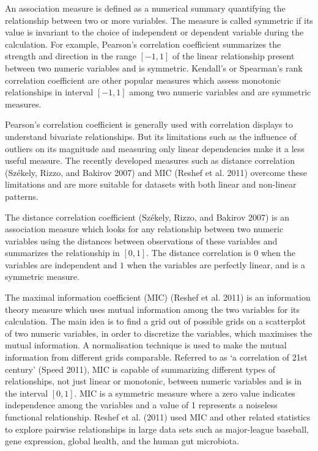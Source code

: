 An association measure is defined as a numerical summary quantifying the relationship between two or more variables. The measure is called symmetric if its value is invariant to the choice of independent or dependent variable during the calculation. For example, Pearson's correlation coefficient summarizes the strength and direction in the range \([-1,1]\) of the linear relationship present between two numeric variables and is symmetric. Kendall's or Spearman's rank correlation coefficient are other popular measures which assess monotonic relationships in interval \([-1,1]\) among two numeric variables and are symmetric measures.

Pearson's correlation coefficient is generally used with correlation displays to understand bivariate relationships. But its limitations such as the influence of outliers on its magnitude and measuring only linear dependencies make it a less useful measure. The recently developed measures such as distance correlation (Székely, Rizzo, and Bakirov 2007) and MIC (Reshef et al. 2011) overcome these limitations and are more suitable for datasets with both linear and non-linear patterns.

The distance correlation coefficient (Székely, Rizzo, and Bakirov 2007) is an association measure which looks for any relationship between two numeric variables using the distances between observations of these variables and summarizes the relationship in \([0,1]\). The distance correlation is \(0\) when the variables are independent and \(1\) when the variables are perfectly linear, and is a symmetric measure.

The maximal information coefficient (MIC) (Reshef et al. 2011) is an information theory measure which uses mutual information among the two variables for its calculation. The main idea is to find a grid out of possible grids on a scatterplot of two numeric variables, in order to discretize the variables, which maximises the mutual information. A normalisation technique is used to make the mutual information from different grids comparable. Referred to as `a correlation of 21st century' (Speed 2011), MIC is capable of summarizing different types of relationships, not just linear or monotonic, between numeric variables and is in the interval \([0,1]\). MIC is a symmetric measure where a zero value indicates independence among the variables and a value of 1 represents a noiseless functional relationship. Reshef et al. (2011) used MIC and other related statistics to explore pairwise relationships in large data sets such as major-league baseball, gene expression, global health, and the human gut microbiota.

